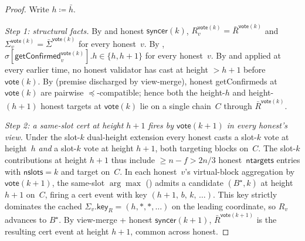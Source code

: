 \documentclass{article}
\newcommand{\ntargets}{\mathsf{ntargets}}
\newcommand{\nslots}{\mathsf{nslots}}
\newcommand{\key}{\mathsf{key}}
\newcommand{\syncer}{\mathsf{syncer}}
\newcommand{\vote}{\mathsf{vote}}
\newcommand{\comm}[1]{\bar{#1}}
\newcommand{\getConfirmed}{\textsf{getConfirmed}\xspace}
\theoremstyle{plain}
\theoremstyle{definition}
\theoremstyle{remark}
\begin{document}
\begin{proof}
Write $h \coloneqq \comm{h}$.

\emph{Step 1: structural facts.}
By  and honest $\syncer(k)$, $R_v^{\vote(k)} = \comm{R}^{\vote(k)}$ and $\Sigma_v^{\vote(k)} = \comm{\Sigma}^{\vote(k)}$ for every honest~$v$. By , $\sigma[\getConfirmed_v^{\vote(k)}].h \in \{h, h+1\}$ for every honest~$v$. By  and  applied at every earlier time, no honest validator has cast at height $>h+1$ before $\vote(k)$. By  (premise discharged by view-merge), honest \getConfirmed{}s at $\vote(k)$ are pairwise $\preceq$-compatible; hence both the height-$h$ and height-$(h+1)$ honest targets at $\vote(k)$ lie on a single chain~$C$ through $\comm{R}^{\vote(k)}$.

\emph{Step 2: a same-slot cert at height $h+1$ fires by $\vote(k+1)$ in every honest's view.}
Under the slot-$k$ dual-height extension every honest casts a slot-$k$ vote at height~$h$ \emph{and} a slot-$k$ vote at height $h+1$, both targeting blocks on~$C$. The slot-$k$ contributions at height $h+1$ thus include $\geq n - f > 2n/3$ honest~$\ntargets$ entries with $\nslots = k$ and target on~$C$. In each honest~$v$'s virtual-block aggregation by $\vote(k+1)$, the same-slot $\arg\max$ () admits a candidate $(B^\star, k)$ at height $h+1$ on~$C$, firing a cert event with key $(h+1,\, b,\, k,\, \ldots)$. This key strictly dominates the cached $\Sigma_v.\key_R = (h, *, *, \ldots)$ on the leading coordinate, so $R_v$ advances to $B^\star$. By view-merge + honest $\syncer(k+1)$, $\comm{R}^{\vote(k+1)}$ is the resulting cert event at height $h+1$, common across honest.


\end{proof}
\end{document}
